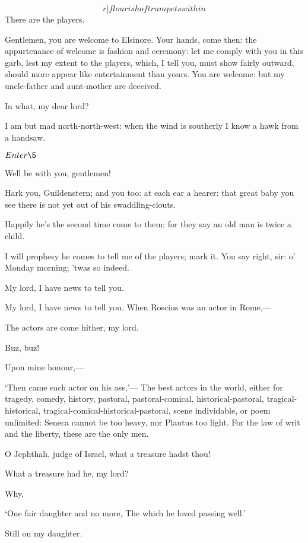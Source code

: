 \documentclass[11pt]{book}
\newenvironment {song}[1][0]
 {\Versus 
  \Locus \textus {+7em+#1em} 
  \Forma \strophae {01}
 }
 {\endVersus}
\begin{document}
   \[r]flourish of trumpets within\]
	There are the players.

\1	Gentlemen, you are welcome to Elsinore. Your hands,
	come then: the appurtenance of welcome is fashion
	and ceremony: let me comply with you in this garb,
	lest my extent to the players, which, I tell you,
	must show fairly outward, should more appear like
	entertainment than yours. You are welcome: but my
	uncle-father and aunt-mother are deceived.

	In what, my dear lord?

\1	I am but mad north-north-west: when the wind is
	southerly I know a hawk from a handsaw.

	\(Enter \5\)

\5	Well be with you, gentlemen!

\aparte\1	Hark you, Guildenstern; and you too: at each ear a
	hearer: that great baby you see there is not yet
	out of his swaddling-clouts.

\aparte{}	Happily he's the second time come to them; for they
	say an old man is twice a child.

\aparte\1	I will prophesy he comes to tell me of the players;
	mark it. You say right, sir: o' Monday morning;
	'twas so indeed.

\5	My lord, I have news to tell you.

\1	My lord, I have news to tell you.
	When Roscius was an actor in Rome,---

\5	The actors are come hither, my lord.

\1	Buz, buz!

\5	Upon mine honour,---

\1	`Then came each actor on his ass,'---
\5	\DriveOut* 
   The best actors in the world, either for tragedy,
	comedy, history, pastoral, pastoral-comical,
	historical-pastoral, tragical-historical,
   tragical-comical-historical-pastoral,
   scene individable, or
	poem unlimited: Seneca cannot be too heavy, nor
	Plautus too light. For the law of writ and the
	liberty, these are the only men.

\1	O Jephthah, judge of Israel, what a treasure hadst thou!


\5	What a treasure had he, my lord?

\1	Why,
\begin{song}[-4]
  `One fair daughter and no more,
	The which he loved passing well.'  
\end{song}

\aparte\5	  Still on my daughter.
\end{document}
